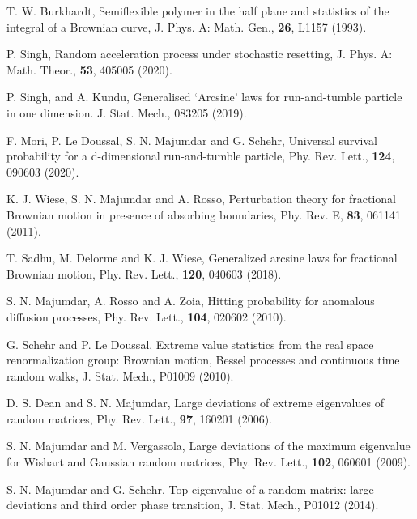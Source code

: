 \documentclass[showpacs,amsmath,amssymb,aps,pre,twocolumn,]{revtex4-1}
\begin{document}
\begin{thebibliography}{}
T. W. Burkhardt, Semiflexible polymer in the half plane and statistics of the integral of a Brownian curve, J. Phys. A: Math. Gen., \textbf{26}, L1157 (1993).

P. Singh, Random acceleration process under stochastic resetting, J. Phys. A: Math. Theor., \textbf{53}, 405005 (2020). 



P. Singh, and A. Kundu, Generalised `Arcsine’ laws for run-and-tumble particle in one dimension. J. Stat. Mech., 083205 (2019).

F. Mori, P. Le Doussal, S. N. Majumdar and G. Schehr, Universal survival probability for a d-dimensional run-and-tumble particle, Phy. Rev. Lett., \textbf{124}, 090603 (2020).


K. J. Wiese, S. N. Majumdar and A. Rosso, Perturbation theory for fractional Brownian motion in presence of absorbing boundaries, Phy. Rev. E, \textbf{83}, 061141 (2011).



T. Sadhu, M. Delorme and K. J. Wiese, Generalized arcsine laws for fractional Brownian motion, Phy. Rev. Lett., \textbf{120}, 040603 (2018).


S. N. Majumdar, A. Rosso and A. Zoia, Hitting probability for anomalous diffusion processes, Phy. Rev. Lett., \textbf{104}, 020602 (2010).

G. Schehr and P. Le Doussal, Extreme value statistics from the real space renormalization group: Brownian motion, Bessel processes and continuous time random walks, J. Stat. Mech., P01009 (2010).


D. S. Dean and S. N. Majumdar, Large deviations of extreme eigenvalues of random matrices, Phy. Rev. Lett., \textbf{97}, 160201 (2006).

S. N. Majumdar and M. Vergassola, Large deviations of the maximum eigenvalue for Wishart and Gaussian random matrices, Phy. Rev. Lett., \textbf{102}, 060601 (2009).

S. N. Majumdar and G. Schehr, Top eigenvalue of a random matrix: large deviations and third order phase transition, J. Stat. Mech., P01012 (2014).



\end{thebibliography}
\end{document}
